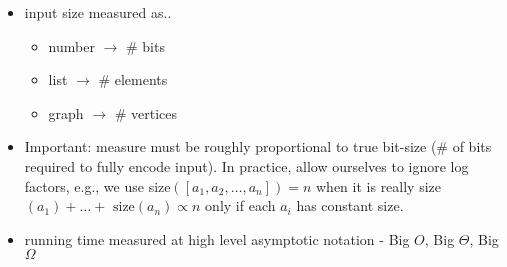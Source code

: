 \begin{itemize}
    \item input size measured as..
        \begin{itemize}
            \item number $\rightarrow$ \# bits 
            \item list $\rightarrow$ \# elements
            \item graph $\rightarrow$ \# vertices
        \end{itemize}
    \item Important: measure must be roughly proportional to true bit-size (\#
        of bits required to fully encode input). In practice, allow ourselves
        to ignore log factors, e.g., we use size$([a_1,a_2,\ldots,a_n])=n$ when
        it is really size$(a_1)+ \dots + \textrm{ size}(a_n) \propto n$ only if
        each $a_i$ has constant size.  
    \item running time measured at high level asymptotic notation - Big $O$,
Big $\Theta$, Big $\Omega$ 
\end{itemize}


